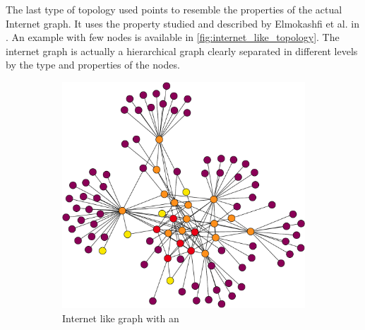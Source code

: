 The last type of topology used points to resemble the properties of the actual
Internet graph.
It uses the property studied and described by Elmokashfi et al. in \cite{elmokashfi2010scalability}.
An example with few nodes is available in \cref{fig:internet_like_topology}.
The internet graph is actually a hierarchical graph clearly separated in different
levels by the type and properties of the nodes.

\begin{figure}[ht]
     \centering
     \begin{subfigure}[b]{0.4\textwidth}
         \centering
         \includegraphics[width=\textwidth]{images/internet_graph/graph-100-colored.pdf}
		 \caption{Internet like graph with an }
         \label{fig:internet_topology_explosive}
     \end{subfigure}
     \hfill
     \begin{subfigure}[b]{0.4\textwidth}
         \centering

\end{subfigure}
\end{figure}
